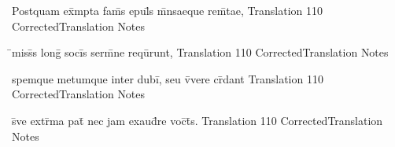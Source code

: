 \documentclass[]{book}
\begin{document}
\latline
  {Postquam ex\={}mpta fam\={}s epul\={\macron {\i}}s m\={}nsaeque rem\={}tae,}
  { Translation }
  {110}
  { CorrectedTranslation }
  { Notes }


\latline
  {\={}miss\={}s long\={} soci\={}s serm\={}ne requ\={\macron {\i}}runt,}
  { Translation }
  {110}
  { CorrectedTranslation }
  { Notes }


\latline
  {spemque metumque inter dubi\={\macron {\i}}, seu v\={\macron {\i}}vere cr\={}dant}
  { Translation }
  {110}
  { CorrectedTranslation }
  { Notes }


\latline
  {s\={\macron {\i}}ve extr\={}ma pat\={\macron {\i}} nec jam exaud\={\macron {\i}}re voc\={}t\={}s.}
  { Translation }
  {110}
  { CorrectedTranslation }
  { Notes }




\end{document}
